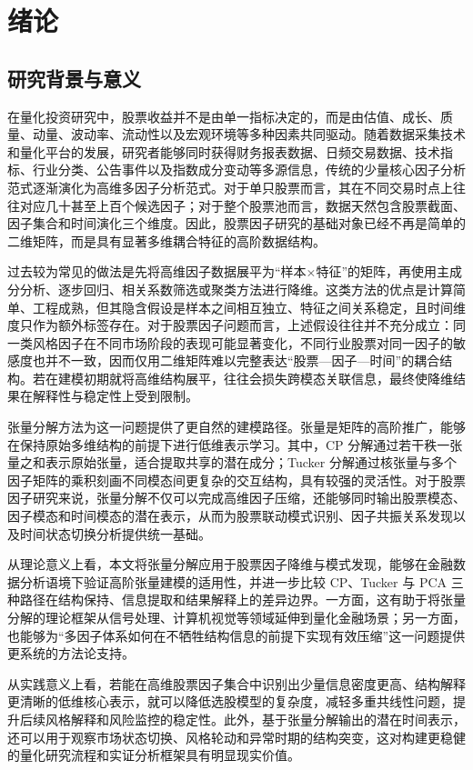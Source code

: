 \chapter{绪论}

\section{研究背景与意义}

在量化投资研究中，股票收益并不是由单一指标决定的，而是由估值、成长、质量、动量、波动率、流动性以及宏观环境等多种因素共同驱动。随着数据采集技术和量化平台的发展，研究者能够同时获得财务报表数据、日频交易数据、技术指标、行业分类、公告事件以及指数成分变动等多源信息，传统的少量核心因子分析范式逐渐演化为高维多因子分析范式。对于单只股票而言，其在不同交易时点上往往对应几十甚至上百个候选因子；对于整个股票池而言，数据天然包含股票截面、因子集合和时间演化三个维度。因此，股票因子研究的基础对象已经不再是简单的二维矩阵，而是具有显著多维耦合特征的高阶数据结构。

过去较为常见的做法是先将高维因子数据展平为“样本$\times$特征”的矩阵，再使用主成分分析、逐步回归、相关系数筛选或聚类方法进行降维。这类方法的优点是计算简单、工程成熟，但其隐含假设是样本之间相互独立、特征之间关系稳定，且时间维度只作为额外标签存在。对于股票因子问题而言，上述假设往往并不充分成立：同一类风格因子在不同市场阶段的表现可能显著变化，不同行业股票对同一因子的敏感度也并不一致，因而仅用二维矩阵难以完整表达“股票—因子—时间”的耦合结构。若在建模初期就将高维结构展平，往往会损失跨模态关联信息，最终使降维结果在解释性与稳定性上受到限制。

张量分解方法为这一问题提供了更自然的建模路径。张量是矩阵的高阶推广，能够在保持原始多维结构的前提下进行低维表示学习。其中，CP 分解通过若干秩一张量之和表示原始张量，适合提取共享的潜在成分；Tucker 分解通过核张量与多个因子矩阵的乘积刻画不同模态间更复杂的交互结构，具有较强的灵活性。对于股票因子研究来说，张量分解不仅可以完成高维因子压缩，还能够同时输出股票模态、因子模态和时间模态的潜在表示，从而为股票联动模式识别、因子共振关系发现以及时间状态切换分析提供统一基础。

从理论意义上看，本文将张量分解应用于股票因子降维与模式发现，能够在金融数据分析语境下验证高阶张量建模的适用性，并进一步比较 CP、Tucker 与 PCA 三种路径在结构保持、信息提取和结果解释上的差异边界。一方面，这有助于将张量分解的理论框架从信号处理、计算机视觉等领域延伸到量化金融场景；另一方面，也能够为“多因子体系如何在不牺牲结构信息的前提下实现有效压缩”这一问题提供更系统的方法论支持。

从实践意义上看，若能在高维股票因子集合中识别出少量信息密度更高、结构解释更清晰的低维核心表示，就可以降低选股模型的复杂度，减轻多重共线性问题，提升后续风格解释和风险监控的稳定性。此外，基于张量分解输出的潜在时间表示，还可以用于观察市场状态切换、风格轮动和异常时期的结构突变，这对构建更稳健的量化研究流程和实证分析框架具有明显现实价值。


